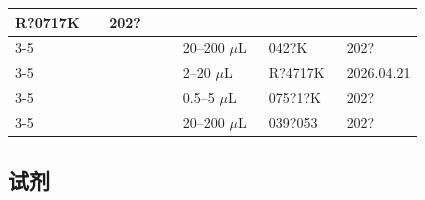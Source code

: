 \documentclass[UTF8,10pt,a4paper,fontset=fandol]{ctexart}
\newcommand{\fieldvalue}[1]{#1}
\newcommand{\handwritten}[1]{#1}
\begin{document}
\begin{center}
\begin{tabular}{|p{0.23\linewidth}|p{0.18\linewidth}|p{0.21\linewidth}|p{0.19\linewidth}|p{0.19\linewidth}|}
\fieldvalue{\handwritten{R?0717K}} &
\fieldvalue{\handwritten{202?}} \\
\cline{3-5}
& &
\fieldvalue{\handwritten{20--200 $\mu$L}} &
\fieldvalue{\handwritten{042?K}} &
\fieldvalue{\handwritten{202?}} \\
\cline{3-5}
& &
\fieldvalue{\handwritten{2--20 $\mu$L}} &
\fieldvalue{\handwritten{R?4717K}} &
\fieldvalue{\handwritten{2026.04.21}} \\
\cline{3-5}
& &
\fieldvalue{\handwritten{0.5--5 $\mu$L}} &
\fieldvalue{\handwritten{075?1?K}} &
\fieldvalue{\handwritten{202?}} \\
\cline{3-5}
& &
\fieldvalue{\handwritten{20--200 $\mu$L}} &
\fieldvalue{\handwritten{039?053}} &
\fieldvalue{\handwritten{202?}} \\
\hline
\end{tabular}
\end{center}

\subsection{试剂}
\end{document}
